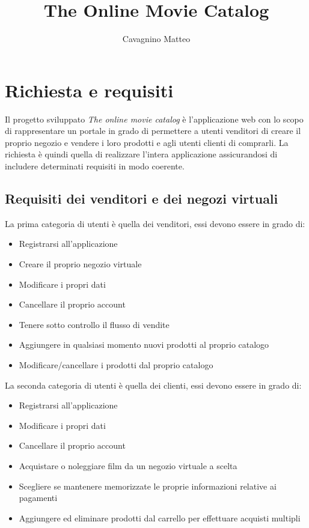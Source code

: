 \documentclass{article}
\title{The Online Movie Catalog}
\author{Cavagnino Matteo}
\begin{document}
\maketitle

\section{Richiesta e requisiti}
Il progetto sviluppato \emph{The online movie catalog} è l'applicazione web con lo scopo di rappresentare un portale in grado di permettere a utenti venditori di creare il proprio
negozio e vendere i loro prodotti e agli utenti clienti di comprarli.
La richiesta è quindi quella di realizzare l'intera applicazione assicurandosi di includere determinati requisiti in modo coerente.

    \subsection{Requisiti dei venditori e dei negozi virtuali}
    La prima categoria di utenti è quella dei venditori, essi devono essere in grado di:
    \begin{itemize}
        \item Registrarsi all'applicazione
        \item Creare il proprio negozio virtuale
        \item Modificare i propri dati
        \item Cancellare il proprio account
        \item Tenere sotto controllo il flusso di vendite
        \item Aggiungere in qualsiasi momento nuovi prodotti al proprio catalogo
        \item Modificare/cancellare i prodotti dal proprio catalogo
    \end{itemize}

La seconda categoria di utenti è quella dei clienti, essi devono essere in grado di:
    \begin{itemize}
        \item Registrarsi all'applicazione
        \item Modificare i propri dati
        \item Cancellare il proprio account
        \item Acquistare o noleggiare film da un negozio virtuale a scelta
        \item Scegliere se mantenere memorizzate le proprie informazioni relative ai pagamenti
        \item Aggiungere ed eliminare prodotti dal carrello per effettuare acquisti multipli
    \end{itemize}
\end{document}
